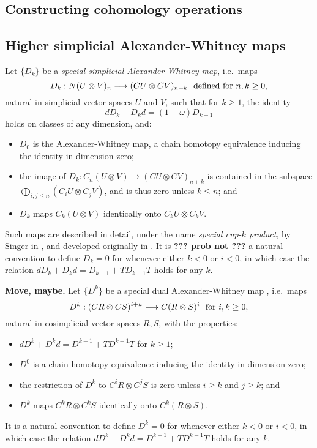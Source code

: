 \documentclass[11pt]{amsart}
\theoremstyle{plain}
\theoremstyle{definition}
\renewcommand{\to}{\longrightarrow}
\theoremstyle{plain}
\newcommand{\twist}{\omega}
\begin{document}
\begin{Constructing (co)homotopy operations}
\section{\textbf{Constructing cohomology operations}}\label{sec:Constructing cohomology operations}

\subsection{Higher simplicial Alexander-Whitney maps}
Let $\{D_k\}$ be a \emph{special simplicial Alexander-Whitney map},  i.e.\  maps
\[D_k:N(U\otimes V)_{n}\to (CU\otimes CV)_{n+k}\textup{\ \ defined for $n,k\geq0$},\]
natural in simplicial vector spaces $U$ and $V$, such that for $k\geq1$, the identity
\[dD_k+D_kd=(1+\twist) D_{k-1}
\]
holds on classes of any dimension, and:
\begin{itemize}
\setlength{\parindent}{.25in}
\item $D_0$ is the Alexander-Whitney map, a chain homotopy equivalence inducing the identity in dimension zero;
\item the image  of $D_k:C_n(U\otimes V)\to (CU\otimes CV)_{n+k}$ is contained in the subspace
$\textstyle\bigoplus_{i,j\leq n}(C_iU\otimes C_jV)$, and is thus zero unless $k\leq n$; and
\item $D_k$ maps $C_{k}(U\otimes V)$ identically onto $C_{k}U\otimes C_{k}V$.
\end{itemize}
Such maps are described in detail, under the name \emph{special cup-$k$ product}, by Singer in \cite[Definitions 1.91 and 1.94]{MR2245560}, and developed originally in \cite{DoldUber}.
It is \textbf{??? prob not ???} a natural convention to define $D_k=0$ for whenever either $k<0$ or $i<0$, in which case the relation $dD_k+D_kd=D_{k-1}+TD_{k-1}T$ holds for any $k$.

\begin{shaded}
\textbf{Move, maybe.}
Let $\{D^k\}$ be a special dual Alexander-Whitney map \cite[Proposition 5.2]{turner_opns_and_sseqs_I.pdf}, i.e.\  maps
\[D^k:(CR\otimes CS)^{i+k}\to C(R\otimes S)^{i}\textup{\ \ for $i,k\geq0$},\]
natural in cosimplicial vector spaces $R,S$,
with the properties:
\begin{itemize}
\setlength{\parindent}{.25in}
\item $dD^k+D^kd=D^{k-1}+TD^{k-1}T$ for $k\geq1$;
\item $D^0$ is a chain homotopy equivalence inducing the identity in dimension zero;
\item the restriction of $D^k$ to $C^{i}R\otimes C^{j}S$ is zero unless $i\geq k$ and $j\geq k$; and
\item $D^k$ maps $C^{k}R\otimes C^{k}S$ identically onto $C^{k}(R\otimes S)$.
\end{itemize}
It is a natural convention to define $D^k=0$ for whenever either $k<0$ or $i<0$, in which case the relation $dD^k+D^kd=D^{k-1}+TD^{k-1}T$ holds for any $k$.
\end{shaded}


\end{Constructing (co)homotopy operations}
\end{document}

